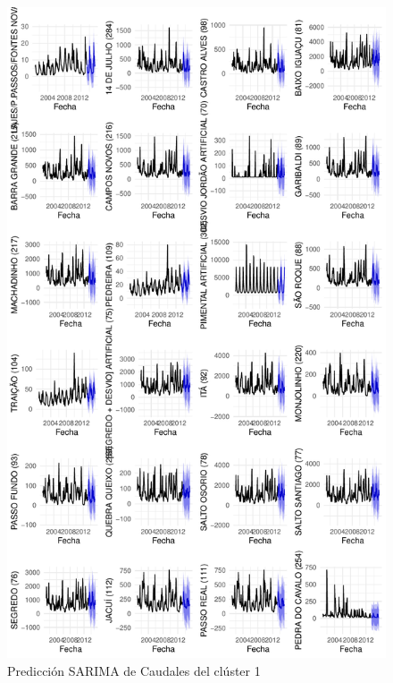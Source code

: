 \documentclass[12pt,oneside]{book}\usepackage[]{graphicx}\usepackage[]{color}
\makeatletter
\def\maxwidth{ %
  \ifdim\Gin@nat@width>\linewidth
    \linewidth
  \else
    \Gin@nat@width
  \fi
}
\newenvironment{knitrout}{}{} %
\theoremstyle{definition} %
\makeatother
\begin{document}
\begin{knitrout}
\color{fgcolor}\begin{figure}[h]

{\centering \includegraphics[width=\maxwidth,height=0.85\textheight]{figure/unnamed-chunk-76-1} 

}

\caption{\label{fig:pred_cl1} Predicción SARIMA de Caudales del clúster 1}\label{fig:unnamed-chunk-76}
\end{figure}


\end{knitrout}
\end{document}
